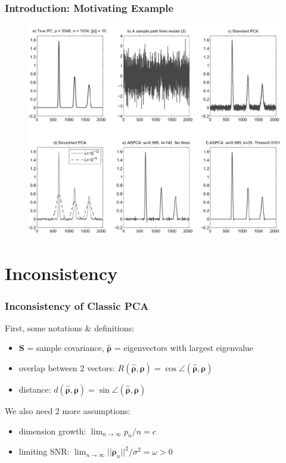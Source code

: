 \documentclass{beamer}
\begin{document}
	\begin{frame}
		\frametitle{Introduction: Motivating Example}
		\begin{figure}
			\includegraphics[width=0.8\linewidth]{image001.png}
		\end{figure}
	\end{frame}
	
	\section{Inconsistency}
	\begin{frame}
		\frametitle{Inconsistency of Classic PCA}
		First, some notations \& definitions:
		\begin{itemize}
			\item
			$\bm{S}$ = sample covariance, $\hat{\bm{\rho}}$ = eigenvectors with largest eigenvalue
			\item
			overlap between 2 vectors: $R(\hat{\bm{\rho}}, \bm{\rho}) = \cos \angle(\hat{\bm{\rho}}, \bm{\rho})$
			\item
			distance: $d(\hat{\bm{\rho}}, \bm{\rho}) = \sin \angle(\hat{\bm{\rho}}, \bm{\rho})$
		\end{itemize}
		We also need 2 more assumptions:
		\begin{itemize}
			\item
			dimension growth: $\lim_{n \to \infty}p_n/n = c$
			\item
			limiting SNR: $\lim_{n \to \infty} ||\bm{\rho}_n||^2/\sigma^2 = \omega>0$
		\end{itemize}
	\end{frame}
	
\end{document}
